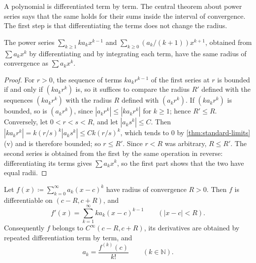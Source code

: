 A polynomial is differentiated term by term. The central theorem about power series says that the same holds for their sums inside the interval of convergence. The first step is that differentiating the terms does not change the radius.

\begin{lemma}
\label{lem:derived-radius}
The power series $\sum_{k\ge1}ka_kx^{k-1}$ and $\sum_{k\ge0}(a_k/(k+1))x^{k+1}$, obtained from $\sum a_kx^k$ by differentiating and by integrating each term, have the same radius of convergence as $\sum a_kx^k$.
\end{lemma}

\begin{proof}
For $r>0$, the sequence of terms $ka_kr^{k-1}$ of the first series at $r$ is bounded if and only if $(ka_kr^k)$ is, so it suffices to compare the radius $R'$ defined with the sequences $(ka_kr^k)$ with the radius $R$ defined with $(a_kr^k)$. If $(ka_kr^k)$ is bounded, so is $(a_kr^k)$, since $|a_kr^k|\le|ka_kr^k|$ for $k\ge1$; hence $R'\le R$. Conversely, let $0<r<s<R$, and let $|a_ks^k|\le C$. Then $|ka_kr^k|=k(r/s)^k|a_ks^k|\le Ck(r/s)^k$, which tends to $0$ by \cref{thm:standard-limits}\,(v) and is therefore bounded; so $r\le R'$. Since $r<R$ was arbitrary, $R\le R'$. The second series is obtained from the first by the same operation in reverse: differentiating its terms gives $\sum a_kx^k$, so the first part shows that the two have equal radii.
\end{proof}

\begin{theorem}
\label{thm:termwise-diff}
Let $f(x)\coloneqq\sum_{k=0}^\infty a_k(x-c)^k$ have radius of convergence $R>0$. Then $f$ is differentiable on $(c-R,c+R)$, and
\[
f'(x)=\sum_{k=1}^\infty ka_k(x-c)^{k-1}\qquad(|x-c|<R).
\]
Consequently $f$ belongs to $C^\infty(c-R,c+R)$, its derivatives are obtained by repeated differentiation term by term, and
\[
a_k=\frac{f^{(k)}(c)}{k!}\qquad(k\in\mathbb N).
\]
\end{theorem}

